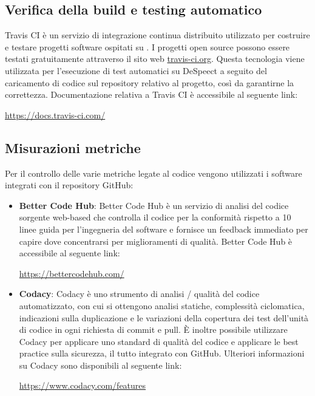 \documentclass[openany,12pt,a4paper]{report}
\begin{document}
	\subsection{Verifica della build e testing automatico}
	Travis CI è un servizio di integrazione continua distribuito utilizzato per costruire e testare progetti software ospitati su . I progetti open source possono essere testati gratuitamente attraverso il sito web \url{travis-ci.org}. Questa tecnologia viene utilizzata per l'esecuzione di test automatici su DeSpeect a seguito del caricamento di codice sul repository relativo al progetto, così da garantirne la correttezza. Documentazione relativa a Travis CI è accessibile al seguente link:
	\begin{center}
		\url{https://docs.travis-ci.com/}
	\end{center}
	
	\subsection{Misurazioni metriche}
	Per il controllo delle varie metriche legate al codice vengono utilizzati i software integrati con il repository GitHub:
	\begin{itemize}
		\item \textbf{Better Code Hub}: Better Code Hub è un servizio di analisi del codice sorgente web-based che controlla il codice per la conformità rispetto a 10 linee guida per l'ingegneria del software e fornisce un feedback immediato per capire dove concentrarsi per miglioramenti di qualità. Better Code Hub è accessibile al seguente link:
		\begin{center}
			\url{https://bettercodehub.com/}
		\end{center}
		
		\item \textbf{Codacy}: Codacy è uno strumento di analisi / qualità del codice automatizzato, con cui si ottengono analisi statiche, complessità ciclomatica, indicazioni sulla duplicazione e le variazioni della copertura dei test dell'unità di codice in ogni richiesta di commit e pull. È inoltre possibile utilizzare Codacy per applicare uno standard di qualità del codice e applicare le best practice sulla sicurezza, il tutto integrato con GitHub. Ulteriori informazioni su Codacy sono disponibili al seguente link:
		\begin{center}
			\url{https://www.codacy.com/features}
		\end{center}
	\end{itemize} 
	
\end{document}

